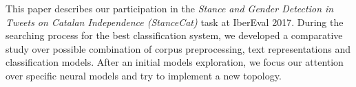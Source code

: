 \abstract

This paper describes our participation in the \emph{Stance and Gender Detection in Tweets on Catalan Independence (StanceCat)} task at IberEval 2017.
During the searching process for the best classification system, we developed a comparative study over possible combination of corpus preprocessing, text representations and classification models. After an initial models exploration, we focus our attention over specific neural models and try to implement a new topology.
